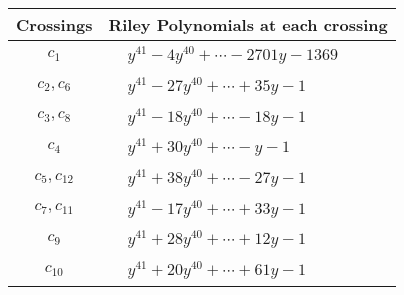 \documentclass[1p]{elsarticle_modified}
\theoremstyle{definition}
\begin{document}
\begin{tabular}{m{50pt}|m{274pt}}
Crossings & \hspace{64pt}Riley Polynomials at each crossing \\
\hline $$\begin{aligned}c_{1}\end{aligned}$$&$\begin{aligned}
&y^{41}-4 y^{40}+\cdots-2701 y-1369
\end{aligned}$\\
\hline $$\begin{aligned}c_{2},c_{6}\end{aligned}$$&$\begin{aligned}
&y^{41}-27 y^{40}+\cdots+35 y-1
\end{aligned}$\\
\hline $$\begin{aligned}c_{3},c_{8}\end{aligned}$$&$\begin{aligned}
&y^{41}-18 y^{40}+\cdots-18 y-1
\end{aligned}$\\
\hline $$\begin{aligned}c_{4}\end{aligned}$$&$\begin{aligned}
&y^{41}+30 y^{40}+\cdots- y-1
\end{aligned}$\\
\hline $$\begin{aligned}c_{5},c_{12}\end{aligned}$$&$\begin{aligned}
&y^{41}+38 y^{40}+\cdots-27 y-1
\end{aligned}$\\
\hline $$\begin{aligned}c_{7},c_{11}\end{aligned}$$&$\begin{aligned}
&y^{41}-17 y^{40}+\cdots+33 y-1
\end{aligned}$\\
\hline $$\begin{aligned}c_{9}\end{aligned}$$&$\begin{aligned}
&y^{41}+28 y^{40}+\cdots+12 y-1
\end{aligned}$\\
\hline $$\begin{aligned}c_{10}\end{aligned}$$&$\begin{aligned}
&y^{41}+20 y^{40}+\cdots+61 y-1
\end{aligned}$\\
\hline
\end{tabular}\\~\\
\end{document}
